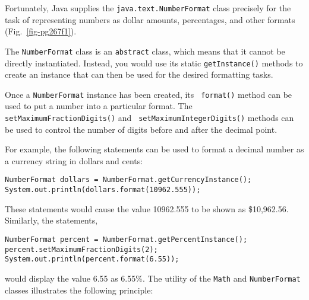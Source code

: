 Fortunately, Java supplies the {\tt java.text.NumberFormat}
class precisely for the task of representing numbers as dollar
amounts, percentages, and other formats (Fig.~\ref{fig-pg267f1}).

The {\tt NumberFormat} class is an {\tt abstract} class, which means
that it cannot be directly instantiated. Instead, you would use its
static {\tt getInstance()} methods to create an instance that can then
be used for the desired formatting tasks.

Once a {\tt NumberFormat} instance has been created, its {\tt
format()} method can be used to put a number into a particular
format. The {\tt setMaximumFractionDigits()} and {\tt
setMaximumIntegerDigits()} methods can be used to control the number
of digits before and after the decimal point.

For example, the following statements can be used to format a
decimal number as a currency string in dollars and cents:

\begin{jjjlisting}
\begin{lstlisting}
NumberFormat dollars = NumberFormat.getCurrencyInstance();
System.out.println(dollars.format(10962.555));
\end{lstlisting}
\end{jjjlisting}

\noindent These statements would cause the value 10962.555 to
be shown as \$10,962.56. Similarly, the  statements,

\begin{jjjlisting}
\begin{lstlisting}
NumberFormat percent = NumberFormat.getPercentInstance();
percent.setMaximumFractionDigits(2);
System.out.println(percent.format(6.55));
\end{lstlisting}
\end{jjjlisting}

\noindent would display the value 6.55 as 6.55\%. The 
utility of the {\tt Math} and {\tt NumberFormat} classes illustrates
the following principle:



